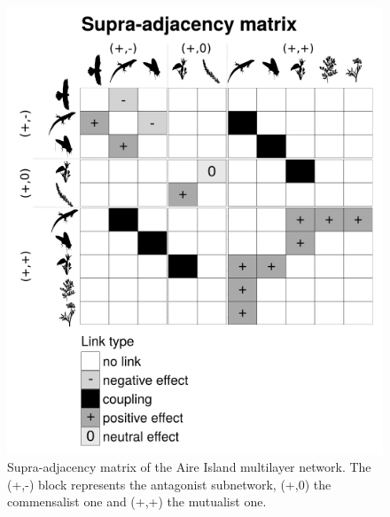 \begin{figure}[ht]
\centering
\includegraphics[width=.6\textwidth]{./Figures/Appendix2_2/MLN_supra_adjacency_AIRE.png}
\caption[Multilayer supra adjacency Aire island]{\color{Gray} Supra-adjacency matrix of the Aire Island multilayer network. The (+,-) block represents the antagonist subnetwork, (+,0) the commensalist one and (+,+) the mutualist one.}
\label{fig:figApp2.2.4}
\end{figure}
